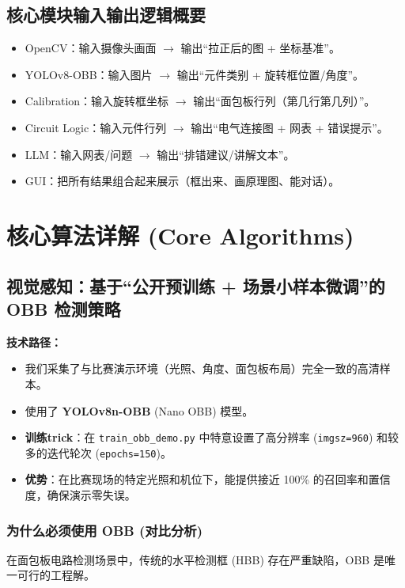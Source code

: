 \documentclass[a4paper,AutoFakeBold,oneside,12pt]{book}
\begin{document}
\section{核心模块输入输出逻辑概要}
\begin{itemize}
    \item OpenCV：输入摄像头画面 $\rightarrow$ 输出“拉正后的图 + 坐标基准”。
    \item YOLOv8-OBB：输入图片 $\rightarrow$ 输出“元件类别 + 旋转框位置/角度”。
    \item Calibration：输入旋转框坐标 $\rightarrow$ 输出“面包板行列（第几行第几列）”。
    \item Circuit Logic：输入元件行列 $\rightarrow$ 输出“电气连接图 + 网表 + 错误提示”。
    \item LLM：输入网表/问题 $\rightarrow$ 输出“排错建议/讲解文本”。
    \item GUI：把所有结果组合起来展示（框出来、画原理图、能对话）。
\end{itemize}

\chapter{核心算法详解 (Core Algorithms)}

\section{视觉感知：基于“公开预训练 + 场景小样本微调”的 OBB 检测策略}
\textbf{技术路径：}
\begin{itemize}
    \item 我们采集了与比赛演示环境（光照、角度、面包板布局）完全一致的高清样本。
    \item 使用了 \textbf{YOLOv8n-OBB} (Nano OBB) 模型。
    \item \textbf{训练trick}：在 \texttt{train\_obb\_demo.py} 中特意设置了高分辨率 (\texttt{imgsz=960}) 和较多的迭代轮次 (\texttt{epochs=150})。
    \item \textbf{优势}：在比赛现场的特定光照和机位下，能提供接近 100\% 的召回率和置信度，确保演示零失误。
\end{itemize}

\subsection*{为什么必须使用 OBB (对比分析)}
在面包板电路检测场景中，传统的水平检测框 (HBB) 存在严重缺陷，OBB 是唯一可行的工程解。
\end{document}
